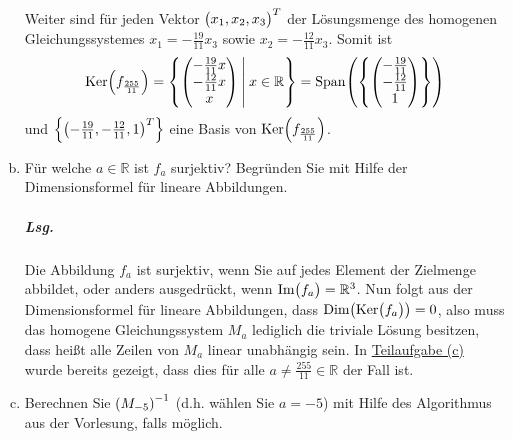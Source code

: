 \documentclass{scrreprt}
\begin{document}
\begin{enumerate}[(a)]
  Weiter sind für jeden Vektor $\qty\big(x_1, x_2, x_3)^T$ der Lösungsmenge des
  homogenen Gleichungssystemes $x_1 = -\frac{19}{11}x_3$ sowie
  $x_2 = -\frac{12}{11}x_3$.
  Somit ist
  \[
    \text{Ker}\qty(f_{\frac{255}{11}}) = \qty{
      \begin{pmatrix}
        -\frac{19}{11}x \\
        -\frac{12}{11}x \\
        x
      \end{pmatrix}
      \:\middle|\:
      x \in \mathbb{R}
    } = \text{Span}\qty(\qty{
      \begin{pmatrix}
        -\frac{19}{11} \\
        -\frac{12}{11} \\
        1
      \end{pmatrix}
    })
  \]
  und $\qty{\qty(-\frac{19}{11}, -\frac{12}{11}, 1)^T}$ eine Basis von
  $\text{Ker}\qty(f_{\frac{255}{11}})$.

\item Für welche $a \in \mathbb{R}$ ist $f_a$ surjektiv?
  Begründen Sie mit Hilfe der Dimensionsformel für lineare Abbildungen.

  \subparagraph{Lsg.} Die Abbildung $f_a$ ist surjektiv, wenn Sie auf jedes
  Element der Zielmenge abbildet, oder anders ausgedrückt, wenn
  $\text{Im}\qty\big(f_a) = \mathbb{R}^3$.
  Nun folgt aus der Dimensionsformel für lineare Abbildungen, dass
  $\text{Dim}\qty(\text{Ker}\qty\big(f_a)) = 0$, also muss das homogene
  Gleichungssystem $M_a$ lediglich die triviale Lösung besitzen, dass heißt
  alle Zeilen von $M_a$ linear unabhängig sein.
  In \hyperref[n7_c]{Teilaufgabe (c)} wurde bereits gezeigt, dass dies für alle
  $a \ne \frac{255}{11} \in \mathbb{R}$ der Fall ist.

\item Berechnen Sie $\qty(M_{-5})^{-1}$ (d.h. wählen Sie $a = -5$) mit Hilfe des
  Algorithmus aus der Vorlesung, falls möglich.


\end{enumerate}
\end{document}
